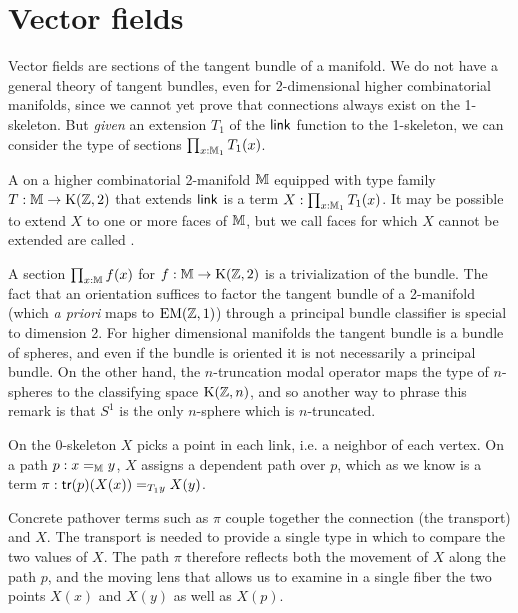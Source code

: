 \section{Vector fields}
Vector fields are sections of the tangent bundle of a manifold. We do not have a general theory of tangent bundles, even for 2-dimensional higher combinatorial manifolds, since we cannot yet prove that connections always exist on the 1-skeleton. But \emph{given} an extension \( T_1 \) of the \( \operatorname{\mathsf{link}} \) function to the 1-skeleton, we can consider the type of sections \( \prod_{x:\mathbb{M}_1}T_1(x) \).

\begin{mydef}
A  on a higher combinatorial 2-manifold \( \mathbb{M} \) equipped with type family \( T:\mathbb{M}\to\mathrm{K}(\mathbb{Z},2) \) that extends \( \operatorname{\mathsf{link}} \) is a term \( X:\prod_{x:\mathbb{M}_1}T_1(x) \). It may be possible to extend \( X \) to one or more faces of \( \mathbb{M} \), but we call faces for which \( X \) cannot be extended are called .
\end{mydef}

\begin{mynote}
A section \( \prod_{x:\mathbb{M}}f(x) \) for \( f:\mathbb{M}\to\mathrm{K}(\mathbb{Z},2) \) is a trivialization of the bundle. The fact that an orientation suffices to factor the tangent bundle of a 2-manifold (which \emph{a priori} maps to \( \mathrm{EM}(\mathbb{Z},1) \)) through a principal bundle classifier is special to dimension 2. For higher dimensional manifolds the tangent bundle is a bundle of spheres, and even if the bundle is oriented it is not necessarily a principal bundle. On the other hand, the \( n \)-truncation modal operator maps the type of \( n \)-spheres to the classifying space \( \mathrm{K}(\mathbb{Z},n) \), and so another way to phrase this remark is that \( S^1 \) is the only \( n \)-sphere which is \( n \)-truncated.
\end{mynote}

On the 0-skeleton \( X \) picks a point in each link, i.e. a neighbor of each vertex. On a path \( p:x=_{\mathbb{M}} y \), \( X \) assigns a dependent path over \( p \), which as we know is a term \( \pi:\mathsf{tr}(p)(X(x))=_{T_1 y} X(y) \).

\begin{mynote}Concrete pathover terms such as \( \pi \) couple together the connection (the transport) and \( X \). The transport is needed to provide a single type in which to compare the two values of \( X \). The path \( \pi \) therefore reflects both the movement of \( X \) along the path \( p \), and the moving lens that allows us to examine in a single fiber the two points \( X(x) \) and \( X(y) \) as well as \( X(p) \).\end{mynote}

